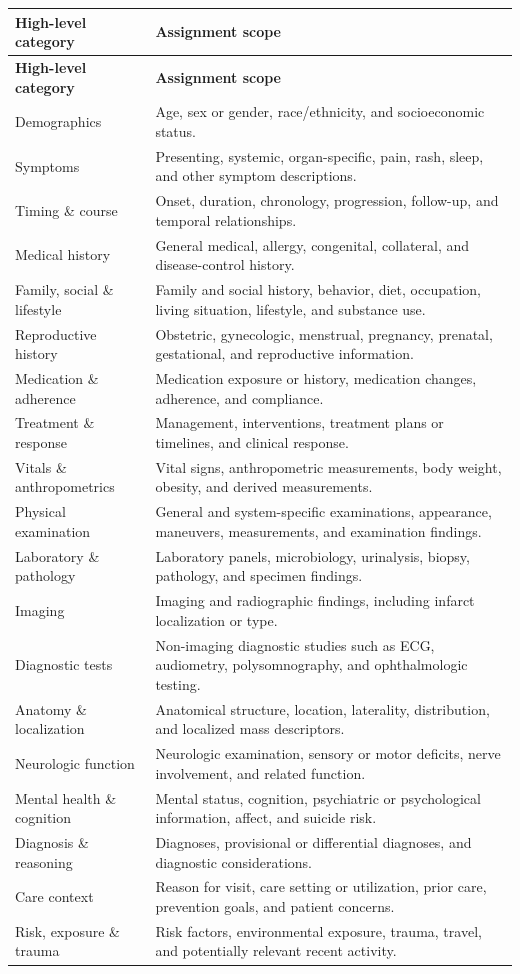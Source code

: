 \begingroup\small
\begin{longtable}{@{}>{\raggedright\arraybackslash}p{}p{}@{}}
\hline
\textbf{High-level category} & \textbf{Assignment scope} \\
\hline
\endfirsthead
\hline
\textbf{High-level category} & \textbf{Assignment scope} \\
\hline
\endhead
Demographics & Age, sex or gender, race/ethnicity, and socioeconomic status. \\
Symptoms & Presenting, systemic, organ-specific, pain, rash, sleep, and other symptom descriptions. \\
Timing \& course & Onset, duration, chronology, progression, follow-up, and temporal relationships. \\
Medical history & General medical, allergy, congenital, collateral, and disease-control history. \\
Family, social \& lifestyle & Family and social history, behavior, diet, occupation, living situation, lifestyle, and substance use. \\
Reproductive history & Obstetric, gynecologic, menstrual, pregnancy, prenatal, gestational, and reproductive information. \\
Medication \& adherence & Medication exposure or history, medication changes, adherence, and compliance. \\
Treatment \& response & Management, interventions, treatment plans or timelines, and clinical response. \\
Vitals \& anthropometrics & Vital signs, anthropometric measurements, body weight, obesity, and derived measurements. \\
Physical examination & General and system-specific examinations, appearance, maneuvers, measurements, and examination findings. \\
Laboratory \& pathology & Laboratory panels, microbiology, urinalysis, biopsy, pathology, and specimen findings. \\
Imaging & Imaging and radiographic findings, including infarct localization or type. \\
Diagnostic tests & Non-imaging diagnostic studies such as ECG, audiometry, polysomnography, and ophthalmologic testing. \\
Anatomy \& localization & Anatomical structure, location, laterality, distribution, and localized mass descriptors. \\
Neurologic function & Neurologic examination, sensory or motor deficits, nerve involvement, and related function. \\
Mental health \& cognition & Mental status, cognition, psychiatric or psychological information, affect, and suicide risk. \\
Diagnosis \& reasoning & Diagnoses, provisional or differential diagnoses, and diagnostic considerations. \\
Care context & Reason for visit, care setting or utilization, prior care, prevention goals, and patient concerns. \\
Risk, exposure \& trauma & Risk factors, environmental exposure, trauma, travel, and potentially relevant recent activity. \\
\hline
\end{longtable}
\endgroup
